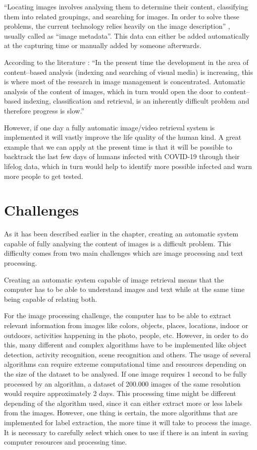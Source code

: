 ``Locating images involves analysing them to determine their content, classifying them into related groupings, and searching for  images. In order to solve these problems, the current technology relies heavily on the image description'' \cite{Zhang2008}, usually called as ``image metadata''. This data can either be added automatically at the capturing time or manually added by someone afterwards.

According to the literature \cite{Zhang2008} : ``In the present time the development in the area of content–based analysis (indexing and searching of visual media) is increasing, this is where most of the research in image management is concentrated. Automatic analysis of the content of images, which in turn would open the door to content–based indexing, classification and retrieval, is an inherently difficult problem and therefore progress is slow.''

However, if one day a fully automatic image/video retrieval system is implemented it will vastly improve the life quality of the human kind. A great example that we can apply at the present time is that it will be possible to backtrack the last few days of humans infected with COVID-19 through their lifelog data, which in turn would help to identify more possible infected and warn more people to get tested.

\section{Challenges}

As it has been described earlier in the chapter, creating an automatic system capable of fully analysing the content of images is a difficult problem. This difficulty comes from two main challenges which are image processing and text processing. 

Creating an automatic system capable of image retrieval means that the computer has to be able to understand images and text while at the same time being capable of relating both.

For the image processing challenge, the computer has to be able to extract relevant information from images like colors, objects, places, locations, indoor or outdoors, activities happening in the photo, people, etc. However, in order to do this, many different and complex algorithms have to be implemented like object detection, activity recognition, scene recognition and others. The usage of several algorithms can require extreme computational time and resources depending on the size of the dataset to be analysed. If one image requires 1 second to be fully processed by an algorithm, a dataset of 200.000 images of the same resolution would require approximately 2 days. This processing time might be different depending of the algorithm used, since it can either extract more or less labels from the images. However, one thing is certain, the more algorithms that are implemented for label extraction, the more time it will take to process the image. It is necessary to carefully select which ones to use if there is an intent in saving computer resources and processing time.


